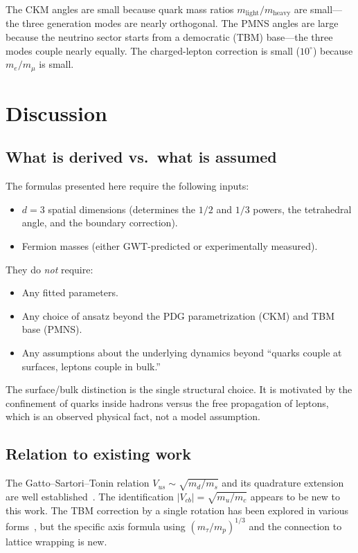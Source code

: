 \documentclass[12pt,a4paper]{article}
\begin{document}
The CKM angles are small because quark mass ratios $m_{\mathrm{light}}/m_{\mathrm{heavy}}$ are small---the three generation modes are nearly orthogonal. The PMNS angles are large because the neutrino sector starts from a democratic (TBM) base---the three modes couple nearly equally. The charged-lepton correction is small ($10^\circ$) because $m_e/m_\mu$ is small.

\section{Discussion}

\subsection{What is derived vs.\ what is assumed}

The formulas presented here require the following inputs:
\begin{itemize}[nosep]
  \item $d=3$ spatial dimensions (determines the $1/2$ and $1/3$ powers, the tetrahedral angle, and the boundary correction).
  \item Fermion masses (either GWT-predicted or experimentally measured).
\end{itemize}

They do \emph{not} require:
\begin{itemize}[nosep]
  \item Any fitted parameters.
  \item Any choice of ansatz beyond the PDG parametrization (CKM) and TBM base (PMNS).
  \item Any assumptions about the underlying dynamics beyond ``quarks couple at surfaces, leptons couple in bulk.''
\end{itemize}

The surface/bulk distinction is the single structural choice. It is motivated by the confinement of quarks inside hadrons versus the free propagation of leptons, which is an observed physical fact, not a model assumption.

\subsection{Relation to existing work}

The Gatto--Sartori--Tonin relation $V_{us}\sim\sqrt{m_d/m_s}$ and its quadrature extension are well established~\cite{gatto1968,fritzsch2000}. The identification $|V_{cb}|=\sqrt{m_u/m_c}$ appears to be new to this work. The TBM correction by a single rotation has been explored in various forms~\cite{king2013,altarelli2010}, but the specific axis formula using $(m_\tau/m_p)^{1/3}$ and the connection to lattice wrapping is new.
\end{document}
